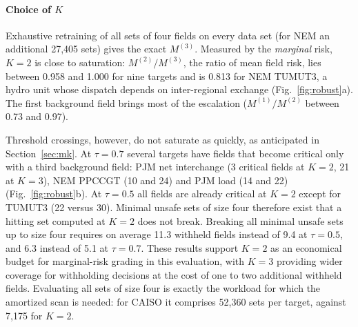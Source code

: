 \paragraph{Choice of $K$}
Exhaustive retraining of all sets of four fields on every data set (for NEM an additional 27,405 sets)
gives the exact $M^{(3)}$. Measured by the \emph{marginal} risk, $K=2$ is close to saturation:
$M^{(2)}/M^{(3)}$, the ratio of mean field risk, lies between 0.958 and 1.000 for nine targets and is
0.813 for NEM TUMUT3, a hydro unit whose dispatch depends on inter-regional exchange
(Fig.~\ref{fig:robust}a). The first background field brings most of the escalation ($M^{(1)}/M^{(2)}$
between 0.73 and 0.97).

Threshold crossings, however, do not saturate as quickly, as anticipated in Section~\ref{sec:mk}. At $\tau=0.7$ several targets have fields that become critical only with a third
background field: PJM net interchange (3 critical fields at $K=2$, 21 at $K=3$), NEM PPCCGT (10 and
24) and PJM load (14 and 22) (Fig.~\ref{fig:robust}b). At $\tau=0.5$ all fields are already critical at
$K=2$ except for TUMUT3 (22 versus 30). Minimal unsafe sets of size four therefore exist that a
hitting set computed at $K=2$ does not break. Breaking all minimal unsafe sets up to size four
requires on average 11.3 withheld fields instead of 9.4 at $\tau=0.5$, and 6.3 instead of 5.1 at
$\tau=0.7$. These results support $K=2$ as an economical budget for marginal-risk grading in this evaluation, with $K=3$ providing wider coverage for withholding decisions at the cost of one to two additional withheld fields. Evaluating all sets of size four is exactly the workload for which the amortized
scan is needed: for CAISO it comprises 52,360 sets per target, against 7,175 for $K=2$.



